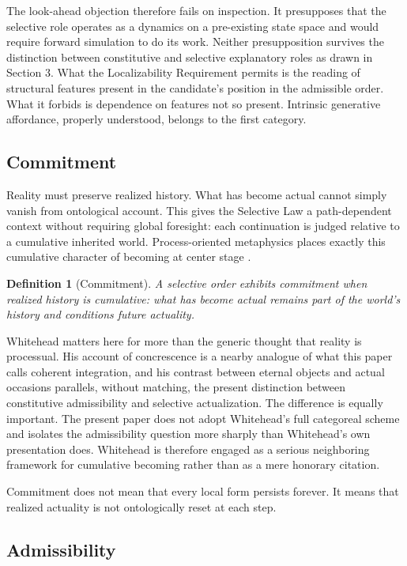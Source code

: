 \documentclass[11pt]{article}
\theoremstyle{foundation}
\newtheorem{definition}{Definition}
\begin{document}
The look-ahead objection therefore fails on inspection. It presupposes that the selective role operates as a dynamics on a pre-existing state space and would require forward simulation to do its work. Neither presupposition survives the distinction between constitutive and selective explanatory roles as drawn in Section 3. What the Localizability Requirement permits is the reading of structural features present in the candidate's position in the admissible order. What it forbids is dependence on features not so present. Intrinsic generative affordance, properly understood, belongs to the first category.

\subsection{Commitment}

Reality must preserve realized history. What has become actual cannot simply vanish from ontological account. This gives the Selective Law a path-dependent context without requiring global foresight: each continuation is judged relative to a cumulative inherited world. Process-oriented metaphysics places exactly this cumulative character of becoming at center stage \citep{Whitehead1929,Rescher1996}.

\begin{definition}[Commitment]
A selective order exhibits commitment when realized history is cumulative: what has become actual remains part of the world's history and conditions future actuality.
\end{definition}

Whitehead matters here for more than the generic thought that reality is processual. His account of concrescence is a nearby analogue of what this paper calls coherent integration, and his contrast between eternal objects and actual occasions parallels, without matching, the present distinction between constitutive admissibility and selective actualization. The difference is equally important. The present paper does not adopt Whitehead's full categoreal scheme and isolates the admissibility question more sharply than Whitehead's own presentation does. Whitehead is therefore engaged as a serious neighboring framework for cumulative becoming rather than as a mere honorary citation.

Commitment does not mean that every local form persists forever. It means that realized actuality is not ontologically reset at each step.

\subsection{Admissibility}
\end{document}
